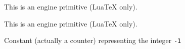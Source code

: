 \begin{function}[]
  {
    \luadef
  }
  \begin{syntax}
  \end{syntax}
  This is an engine primitive (Lua\TeX{} only).
\end{function}



\begin{function}[]
  {
    \luafunction
  }
  \begin{syntax}
  \end{syntax}
  This is an engine primitive (Lua\TeX{} only).
\end{function}



\begin{function}[]
  {
    \m@ne
  }
  \begin{syntax}
  \end{syntax}
  Constant (actually a counter) representing the integer \texttt{-1}
\end{function}



\begin{function}[]
  {
    \m@th
  }
  \begin{syntax}
  \end{syntax}

\end{function}



\begin{function}[]
  {
    \magstep
  }
  \begin{syntax}
  \end{syntax}

\end{function}



\begin{function}[]
  {
    \magstephalf
  }
  \begin{syntax}
  \end{syntax}

\end{function}



\begin{function}[]
  {
    \makebox
  }
  \begin{syntax}
  \end{syntax}

\end{function}



